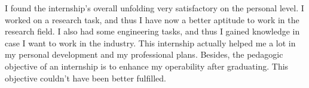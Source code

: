 I found the internship's overall unfolding very satisfactory on the personal level. I worked on a research task, and thus I have now a better aptitude to work in the research field. I also had some engineering tasks, and thus I gained knowledge in case I want to work in the industry. This internship actually helped me a lot in my personal development and my professional plans. Besides, the pedagogic objective of an internship is to enhance my operability after graduating. This objective couldn't have been better fulfilled.